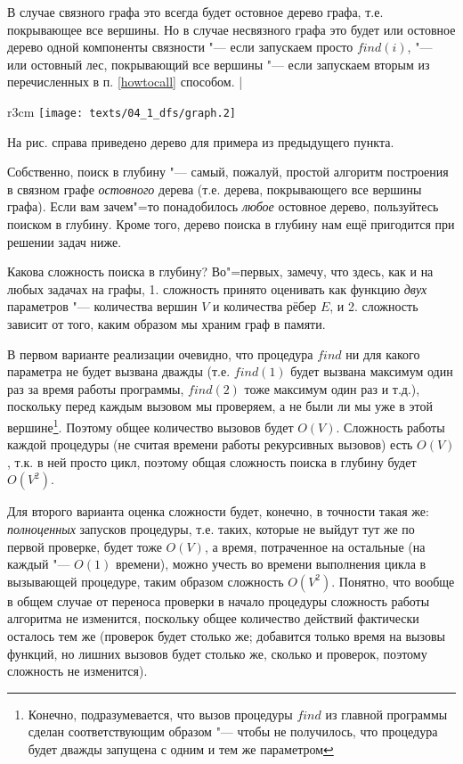 В случае связного графа это всегда будет остовное дерево графа, т.е. покрывающее все вершины. Но в случае
несвязного графа это будет или остовное дерево одной компоненты связности "--- если запускаем просто $find(i)$,
"--- или остовный лес, покрывающий все вершины "--- если запускаем вторым из перечисленных в п. \ref{howtocall}
способом.
|\label{provetree}

\begin{wrapfigure}[5]{r}{3cm}
\vspace{-0.7cm}
\texttt{[image: texts/04\_1\_dfs/graph.2]}
\end{wrapfigure}

На рис. справа приведено дерево для примера из предыдущего пункта.

Собственно, поиск в глубину "--- самый, пожалуй, простой алгоритм построения в связном графе 
\textit{остовного} дерева (т.е. дерева, покрывающего все вершины графа). Если вам зачем"=то 
понадобилось \textit{любое} остовное дерево, пользуйтесь поиском в глубину. Кроме того, дерево 
поиска в глубину нам ещё пригодится при решении задач ниже.

Какова сложность поиска в глубину? Во"=первых, замечу, что здесь, как и на любых задачах на графы, 
1. сложность принято оценивать как функцию \textit{двух} параметров "--- количества вершин $V$ и 
количества рёбер $E$, и 2. сложность зависит от того, каким образом мы храним граф в памяти.

В первом варианте реализации очевидно, что процедура $find$ ни для какого параметра не будет 
вызвана дважды (т.е. $find(1)$ будет вызвана максимум один раз за время работы программы, $find(2)$ 
тоже максимум один раз и т.д.), поскольку перед каждым вызовом мы проверяем, а не были ли мы уже в этой 
вершине\footnote{Конечно, подразумевается, что вызов процедуры $find$ из главной программы сделан 
соответствующим образом "--- чтобы не получилось, что процедура будет дважды запущена с одним и тем 
же параметром}. Поэтому общее количество вызовов будет $O(V)$. Сложность работы каждой процедуры 
(не считая времени работы рекурсивных вызовов) есть $O(V)$, т.к. в ней просто цикл, поэтому общая 
сложность поиска в глубину будет $O(V^2)$. 

Для второго варианта оценка сложности будет, конечно, в точности такая же: \textit{полноценных} 
запусков процедуры, т.е. таких, которые не выйдут тут же по первой проверке, будет тоже $O(V)$, а 
время, потраченное на остальные (на каждый "--- $O(1)$ времени), можно учесть во времени выполнения 
цикла в вызывающей процедуре, таким образом сложность $O(V^2)$. Понятно, что вообще в общем случае 
от переноса проверки в начало процедуры сложность работы алгоритма не изменится, поскольку общее 
количество действий фактически осталось тем же (проверок будет столько же; добавится только время 
на вызовы функций, но лишних вызовов будет столько же, сколько и проверок, поэтому сложность не 
изменится).

